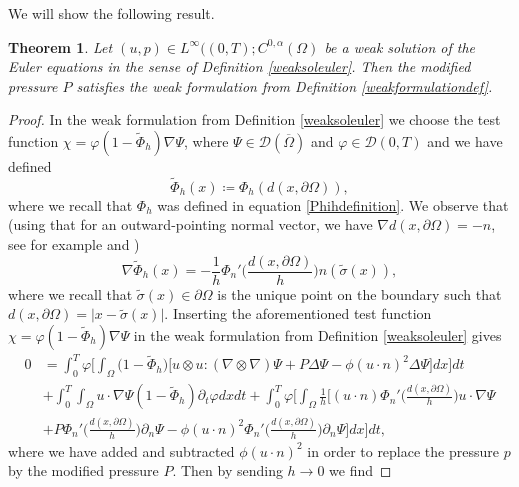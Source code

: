 \documentclass[12pt,a4paper]{article}
\newtheorem{theorem}{Theorem}[section]
\theoremstyle{definition}
\theoremstyle{remark}
\numberwithin{equation}{section}
\begin{document}
We will show the following result.
\begin{theorem} \label{weakformulationthm}
Let $(u,p) \in L^\infty ((0,T); C^{0,\alpha} (\Omega)$ be a weak solution of the Euler equations in the sense of Definition \ref{weaksoleuler}. Then the modified pressure $P$ satisfies the weak formulation from Definition \ref{weakformulationdef}.
\end{theorem}
\begin{proof}
In the weak formulation from Definition \ref{weaksoleuler} we choose the test function $\chi = \varphi (1 - \widetilde{\Phi}_h) \nabla \Psi$, where $\Psi \in \mathcal{D} (\overline{\Omega})$ and $\varphi \in \mathcal{D} (0,T)$ and we have defined 
\begin{equation*}
\widetilde{\Phi}_h (x) \coloneqq \Phi_h (d(x,\partial \Omega)),
\end{equation*}
where we recall that $\Phi_h$ was defined in equation \eqref{Phihdefinition}. We observe that (using that for an outward-pointing normal vector, we have $\nabla d (x,\partial \Omega) = - n$, see for example \cite[~eq. (1.10)]{titi2018} and \cite[~eq. (4.2)]{titi2019})
\begin{equation*}
\nabla \widetilde{\Phi}_h (x) = - \frac{1}{h} \Phi_n' \bigg( \frac{d(x,\partial \Omega)}{h} \bigg) n (\widetilde{\sigma} (x)),
\end{equation*}
where we recall that $\widetilde{\sigma} (x) \in \partial \Omega$ is the unique point on the boundary such that $d (x, \partial \Omega) = \lvert x - \widetilde{\sigma} (x) \rvert$.
Inserting the aforementioned test function $\chi = \varphi (1 - \widetilde{\Phi}_h) \nabla \Psi$ in the weak formulation from Definition \ref{weaksoleuler} gives
\begin{align*}
0 &= \int_0^T \varphi \bigg[ \int_\Omega \big( 1 - \widetilde{\Phi}_h) \bigg[ u \otimes u : (\nabla \otimes \nabla) \Psi + P \Delta \Psi - \phi (u \cdot n)^2 \Delta \Psi \bigg] dx \bigg] dt \\
&+ \int_0^T \int_\Omega u \cdot \nabla \Psi (1 - \widetilde{\Phi}_h) \partial_t \varphi dx dt + \int_0^T \varphi \bigg[ \int_\Omega \frac{1}{h} \bigg[ (u \cdot n)  \Phi_n' \bigg( \frac{d(x,\partial \Omega)}{h} \bigg) u \cdot \nabla \Psi \\
&+ P  \Phi_n' \bigg( \frac{d(x,\partial \Omega)}{h} \bigg) \partial_n \Psi - \phi (u \cdot n)^2 \Phi_n' \bigg( \frac{d(x,\partial \Omega)}{h} \bigg) \partial_n \Psi \bigg] dx \bigg] dt,
\end{align*}
where we have added and subtracted $\phi (u \cdot n)^2$ in order to replace the pressure $p$ by the modified pressure $P$. Then by sending $h \rightarrow 0$ we find

\end{proof}
\end{document}
